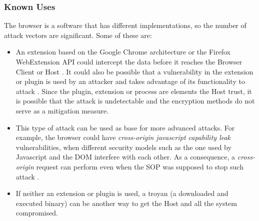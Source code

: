 \documentclass{sig-alternate-05-2015}
\begin{document}
  \subsubsection*{Known Uses} The browser is a software that has different implementations, so the number of attack vectors are significant. Some of these are:
      \begin{itemize}
        \item An extension based on the Google Chrome architecture or the Firefox WebExtension API could intercept the data before it reaches the Browser Client or Host \cite{Paola2006}. It could also be possible that a vulnerability in the extension or plugin is used by an attacker and takes advantage of its functionality to attack \cite{Liu2012,Barth2010}. Since the plugin, extension or process are elements the Host trust, it is possible that the attack is undetectable and the encryption methods do not serve as a mitigation measure.
        \item This type of attack can be used as base for more advanced attacks. For example, the browser could have \textit{cross-origin javascript capability leak} vulnerabilities, when different security models such as the one used by Javascript and the DOM interfere with each other. As a consequence, a \textit{cross-origin} request can perform even when the SOP was supposed to stop such attack \cite{Barth2009}.
        \item If neither an extension or plugin is used, a troyan (a downloaded and executed binary) can be another way to get the Host and all the system compromised.
      \end{itemize}
\end{document}

